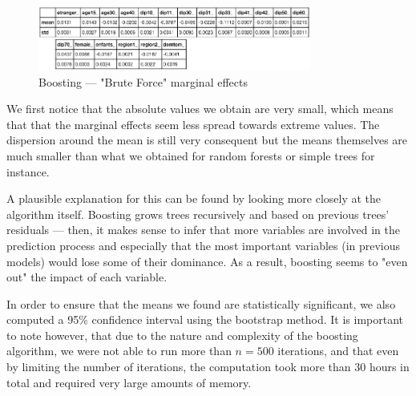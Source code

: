 \begin{figure}
    \centering
    \includegraphics[width=0.8\textwidth]{img/boosting_brute_force.png}
    \caption{Boosting --- "Brute Force" marginal effects}
    \label{fig:boosting_brute_force}
\end{figure}

We first notice that the absolute values we obtain are very small, which means that that the marginal effects seem less spread towards extreme values. The dispersion around the mean is still very consequent but the means themselves are much smaller than what we obtained for random forests or simple trees for instance.

A plausible explanation for this can be found by looking more closely at the algorithm itself. Boosting grows trees recursively and based on previous trees' residuals --- then, it makes sense to infer that more variables are involved in the prediction process and especially that the most important variables (in previous models) would lose some of their dominance. As a result, boosting seems to "even out" the impact of each variable.



In order to ensure that the means we found are statistically significant, we also computed a 95\% confidence interval using the bootstrap method. It is important to note however, that due to the nature and complexity of the boosting algorithm, we were not able to run more than $n=500$ iterations, and that even by limiting the number of iterations, the computation took more than 30 hours in total and required very large amounts of memory.

